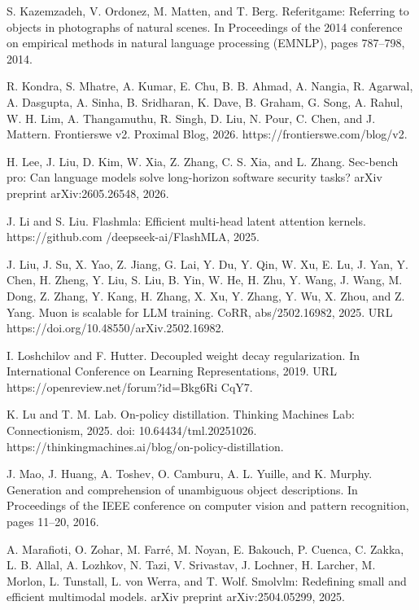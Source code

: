 S. Kazemzadeh, V. Ordonez, M. Matten, and T. Berg. Referitgame:
Referring to objects in photographs of natural scenes. In Proceedings of
the 2014 conference on empirical methods in natural language processing
(EMNLP), pages 787--798, 2014.



R. Kondra, S. Mhatre, A. Kumar, E. Chu, B. B. Ahmad, A. Nangia, R.
Agarwal, A. Dasgupta, A. Sinha, B. Sridharan, K. Dave, B. Graham, G.
Song, A. Rahul, W. H. Lim, A. Thangamuthu, R. Singh, D. Liu, N. Pour, C.
Chen, and J. Mattern. Frontierswe v2. Proximal Blog, 2026.
https://frontierswe.com/blog/v2.

H. Lee, J. Liu, D. Kim, W. Xia, Z. Zhang, C. S. Xia, and L. Zhang.
Sec-bench pro: Can language models solve long-horizon software security
tasks? arXiv preprint arXiv:2605.26548, 2026.

J. Li and S. Liu. Flashmla: Efficient multi-head latent attention
kernels. https://github.com /deepseek-ai/FlashMLA, 2025.

J. Liu, J. Su, X. Yao, Z. Jiang, G. Lai, Y. Du, Y. Qin, W. Xu, E. Lu, J.
Yan, Y. Chen, H. Zheng, Y. Liu, S. Liu, B. Yin, W. He, H. Zhu, Y. Wang,
J. Wang, M. Dong, Z. Zhang, Y. Kang, H. Zhang, X. Xu, Y. Zhang, Y. Wu,
X. Zhou, and Z. Yang. Muon is scalable for LLM training. CoRR,
abs/2502.16982, 2025. URL https://doi.org/10.48550/arXiv.2502.16982.

I. Loshchilov and F. Hutter. Decoupled weight decay regularization. In
International Conference on Learning Representations, 2019. URL
https://openreview.net/forum?id=Bkg6Ri CqY7.

K. Lu and T. M. Lab. On-policy distillation. Thinking Machines Lab:
Connectionism, 2025. doi: 10.64434/tml.20251026.
https://thinkingmachines.ai/blog/on-policy-distillation.

J. Mao, J. Huang, A. Toshev, O. Camburu, A. L. Yuille, and K. Murphy.
Generation and comprehension of unambiguous object descriptions. In
Proceedings of the IEEE conference on computer vision and pattern
recognition, pages 11--20, 2016.

A. Marafioti, O. Zohar, M. Farré, M. Noyan, E. Bakouch, P. Cuenca, C.
Zakka, L. B. Allal, A. Lozhkov, N. Tazi, V. Srivastav, J. Lochner, H.
Larcher, M. Morlon, L. Tunstall, L. von Werra, and T. Wolf. Smolvlm:
Redefining small and efficient multimodal models. arXiv preprint
arXiv:2504.05299, 2025.

